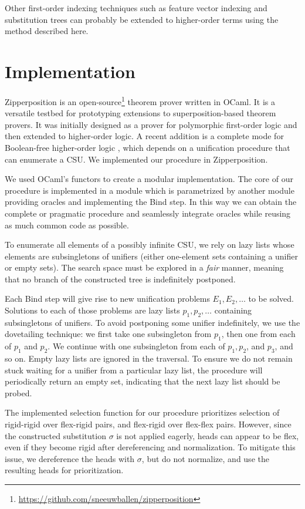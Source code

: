 Other first-order indexing techniques such as feature vector indexing and substitution trees
can probably be extended to higher-order terms using the method described here.
\pagebreak[2]

\section{Implementation}
\label{sec:unif:implementation}
Zipperposition \cite{sc-15-simon-phd, sc-supind-17} is an
open-source\footnote{\url{https://github.com/sneeuwballen/zipperposition}}
theorem prover written in OCaml.
It is a versatile testbed for prototyping extensions to
superposition-based theorem provers.
It was initially
designed as a prover for polymorphic first-order logic
and then extended to higher-order logic.
A recent addition is a complete mode for
Boolean-free higher-order logic \cite{bbtvw-21-sup-lam},
which depends on a unification procedure that can enumerate a CSU. 
We implemented our procedure in Zipperposition.

We used OCaml's functors to create a modular implementation. The core of our
procedure is implemented in a module which is parametrized by another module
providing oracles and implementing the \textsf{Bind} step. In this way we can
obtain the complete or pragmatic procedure and seamlessly integrate
oracles while reusing as much common code as possible.

To enumerate all elements of a possibly infinite CSU, we rely on lazy lists whose
elements are subsingletons of unifiers (either one-element sets containing a unifier
or empty sets). The search space must be explored in a {\em fair} manner,
meaning that no branch of the constructed tree is indefinitely postponed. 

Each {\sf Bind} step will give rise to new unification problems $E_1, E_2,
\ldots$ to be solved. Solutions to each of those problems are lazy lists $p_1,
p_2, \ldots$ containing subsingletons of unifiers. To avoid postponing some
unifier indefinitely, we use the dovetailing technique: we first take one
subsingleton from $p_1$, then one from each of $p_1$ and $p_2$. We continue with
one subsingleton from each of $p_1,p_2$, and $p_3$, and so on. Empty lazy lists are
ignored in the traversal. To ensure we do not remain stuck waiting for a unifier
from a particular lazy list, the procedure will periodically return an empty
set, indicating that the next lazy list should be probed. 

The implemented selection function for our procedure prioritizes selection of
rigid-rigid over flex-rigid pairs, and flex-rigid over flex-flex pairs. However,
since the constructed substitution $\sigma$ is not applied eagerly, heads can
appear to be flex, even if they become rigid after dereferencing and
normalization. To mitigate this issue, we
dereference the heads with $\sigma$, but do not normalize, and use the resulting
heads for prioritization.

